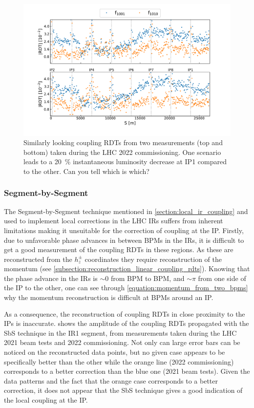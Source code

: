 \begin{figure}
    \centering
    \includegraphics*[width=0.99\linewidth]{Figures/IR_Coupling_Correction/similar_rdts_different_ip1_lumi.pdf}
    \caption{Similarly looking coupling RDTs from two measurements (top and bottom) taken during the LHC \num{2022} commissioning. One scenario leads to a \qty{20}{\percent} instantaneous luminosity decrease at IP\num{1} compared to the other. Can you tell which is which?}
    \label{figure:guess_rdts}
\end{figure}

\subsubsection*{Segment-by-Segment}

The Segment-by-Segment technique mentioned in \cref{section:local_ir_coupling} and used to implement local corrections in the LHC IRs suffers from inherent limitations making it unsuitable for the correction of coupling at the IP.
Firstly, due to unfavorable phase advances in between BPMs in the IRs, it is difficult to get a good measurement of the coupling RDTs in these regions.
As these are reconstructed from the \(h_z^\pm\) coordinates they require reconstruction of the momentum (see \cref{subsection:reconstruction_linear_coupling_rdts}).
Knowing that the phase advance in the IRs is \(\sim 0\) from BPM to BPM, and \(\sim \pi\) from one side of the IP to the other, one can see through \cref{equation:momentum_from_two_bpms} why the momentum reconstruction is difficult at BPMs around an IP.

As a consequence, the reconstruction of coupling RDTs in close proximity to the IPs is inaccurate.
 shows the amplitude of the coupling RDTs propagated with the SbS technique in the IR\num{1} segment, from measurements taken during the LHC \num{2021} beam tests and \num{2022} commissioning.
Not only can large error bars can be noticed on the reconstructed data points, but no given case appears to be specifically better than the other while the \textcolor{mplorange}{orange} line (\num{2022} commissioning) corresponds to a better correction than the \textcolor{mplblue}{blue} one (\num{2021} beam tests).
Given the data patterns and the fact that the orange case corresponds to a better correction, it does not appear that the SbS technique gives a good indication of the local coupling at the IP.

